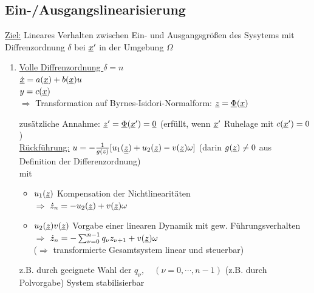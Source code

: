 \documentclass[openany,a4paper,11pt]{book}
\begin{document}
\subsection{Ein-/Ausgangslinearisierung}
\uline{Ziel:} Lineares Verhalten zwischen Ein- und Ausgangsgrößen des Sysytems mit Diffrenzordnung $\delta$ bei $\uline{x}'$ in der Umgebung $\Omega$
\begin{enumerate}
    \item \uline{Volle Diffrenzordnung $\delta=n$}\\
    $\dot{\uline{x}}=a(\uline{x})+b(\uline{x})u$\\
    $y=c(\uline{x})$\\
    $\Rightarrow$ Transformation auf Byrnes-Isidori-Normalform: $\uline{z}=\uline{\Phi}(\uline{x})$\\
    \begin{minipage}[c]{\textwidth}
    \end{minipage}
    zusätzliche Annahme: $\uline{z}'=\uline{\Phi}(\uline{x}')=\uline{0}$ (erfüllt, wenn $\uline{x}'$ Ruhelage mit $c(\uline{x}')=0$)\\
    \uline{Rückführung:} $u=-\frac{1}{g(z)}[u_1(\uline{\uline{z}})+u_2(\uline{z})-v(\uline{z})\omega]$ (darin $g(\uline{z})\ne0$ aus Definition der Differenzordnung)\\
    mit \begin{itemize}
        \item $u_1(\uline{z})$ Kompensation der Nichtlinearitäten\\
         $\Rightarrow$  $\dot{z}_n=-u_2(\uline{z})+v(\uline{z})\omega$
        \item $u_2(\uline{z})v(\uline{z})$ Vorgabe einer linearen Dynamik mit gew. Führungsverhalten\\
         $\Rightarrow$ $\dot{z}_n=-\sum_{\nu=0}^{n-1}q_{\nu}z_{\nu+1}+v(\uline{z})\omega$\\
        ($\Rightarrow$ transformierte Gesamtsystem linear und steuerbar)
    \end{itemize}
    z.B. durch geeignete Wahl der $q_{\nu},\quad (\nu=0,\cdots,n-1)$ (z.B. durch Polvorgabe) System stabilisierbar\\

\end{enumerate}
\end{document}
